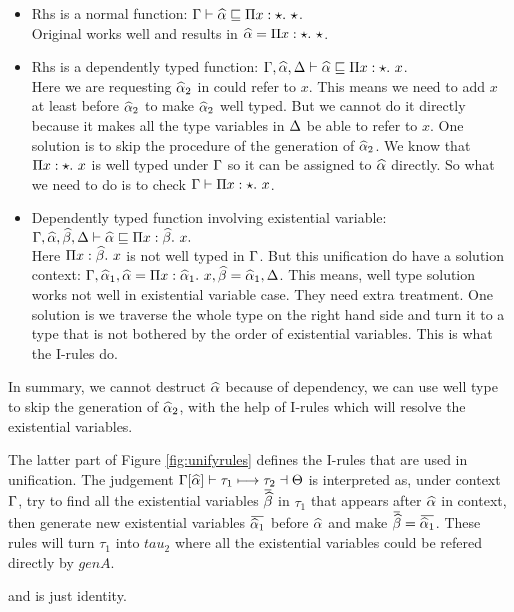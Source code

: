 \begin{itemize}
    \item Rhs is a normal function: $\Gamma \vdash \widehat{\alpha} \sqsubseteq \Pi x:\star.~ \star$.\\
          Original works well and results in $\widehat{\alpha} = \Pi x:\star.~ \star$.
    \item Rhs is a dependently typed function: $\Gamma, \widehat{\alpha}, \Delta \vdash \widehat{\alpha} \sqsubseteq \Pi x:\star.~ x$.\\
          Here we are requesting $\widehat{\alpha}_2$ in  could refer to  $x$. This means we need to add $x$ at least before $\widehat{\alpha}_2$ to make $\widehat{\alpha}_2$ well typed. But we cannot do it directly because it makes all the type variables in $\Delta$ be able to refer to $x$.
          One solution is to skip the procedure of the generation of $\widehat{\alpha}_2$. We know that $\Pi x:\star.~ x$ is well typed under $\Gamma$ so it can be assigned to $\widehat{\alpha}$ directly. So what we need to do is to check $\Gamma \vdash \Pi x:\star.~ x$.
    \item Dependently typed function involving existential variable: $\Gamma, \widehat{\alpha}, \widehat{\beta}, \Delta \vdash \widehat{\alpha} \sqsubseteq \Pi x:\widehat{\beta}.~ x.$\\
          Here $\Pi x:\widehat{\beta}.~ x$ is not well typed in $\Gamma$. But this unification do have a solution context: $\Gamma, \widehat{\alpha}_1, \widehat{\alpha} = \Pi x:\widehat{\alpha}_1.~ x, \widehat{\beta} = \widehat{\alpha}_1, \Delta$. This means, well type solution works not well in existential variable case. They need extra treatment. One solution is we traverse the whole type on the right hand side and turn it to a type that is not bothered by the order of existential variables. This is what the I-rules do.
\end{itemize}

In summary, we cannot destruct $\widehat{\alpha}$ because of dependency, we can use well type to skip the generation of $\widehat{\alpha}_2$, with the help of I-rules which will resolve the existential variables.

The latter part of Figure \ref{fig:unifyrules} defines the I-rules that are used in unification. The judgement $\Gamma[\widehat{\alpha}] \vdash \tau_1 \longmapsto \tau_2 \dashv \Theta$ is interpreted as, under context $\Gamma$, try to find all the existential variables $\overbar \genB$ in $\tau_1$ that appears after $\widehat{\alpha}$ in context, then generate new existential variables $\overbar {\genA_1}$ before $\widehat{\alpha}$ and make $\overbar \genB = \overbar {\genA_1}$. These rules will turn $\tau_1$ into $tau_2$ where all the existential variables could be refered directly by $genA$.

 and  is just identity.

